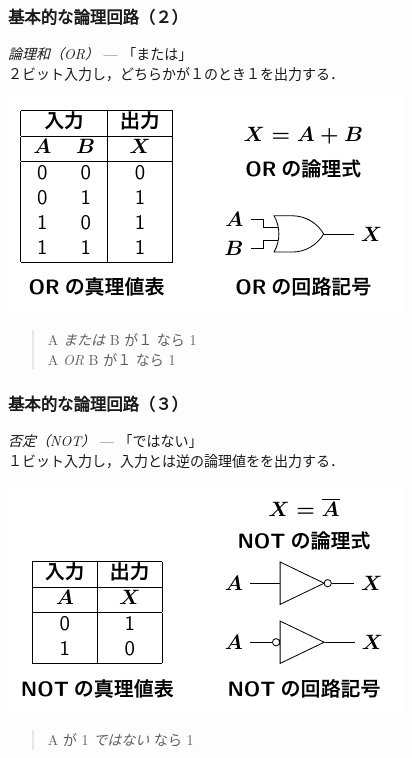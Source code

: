 \documentclass[handout]{beamer}        %
\begin{document}
\begin{frame}
  \frametitle{基本的な論理回路（２）}
  \emph{論理和（OR）} --- 「または」\\
  \vfill
  ２ビット入力し，どちらかが１のとき１を出力する．
  \centerline{\includegraphics[scale=1.4]{../Tikz/or.pdf}}
  \begin{quote}
    A \emph{または} B が１ なら 1\\
    A \emph{OR} B が１ なら 1
  \end{quote}
  \vfill
\end{frame}

\begin{frame}
  \frametitle{基本的な論理回路（３）}
  \emph{否定（NOT）} --- 「ではない」\\
  \vfill
  １ビット入力し，入力とは逆の論理値をを出力する．
  \centerline{\includegraphics[scale=1.4]{../Tikz/not.pdf}}
  \begin{quote}
    A が 1 \emph{ではない} なら 1\\
  \end{quote}
  \vfill
\end{frame}
\end{document}
